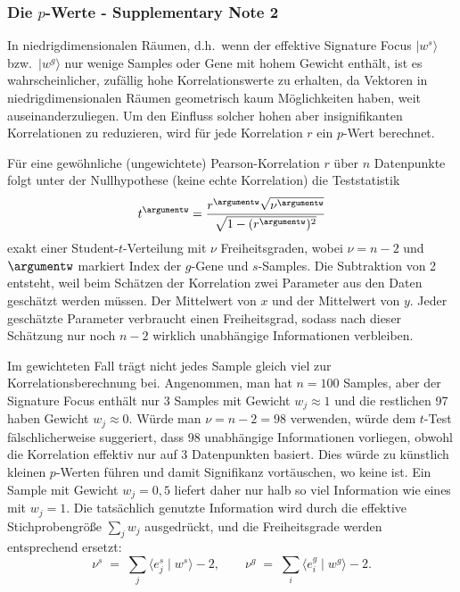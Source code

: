 \subsubsection*{Die $p$-Werte - Supplementary Note 2}


In niedrigdimensionalen Räumen, d.h.\ wenn der effektive Signature
Focus $|w^s\rangle$ bzw.\ $|w^g\rangle$ nur wenige Samples oder Gene
mit hohem Gewicht enthält, ist es wahrscheinlicher, zufällig hohe
Korrelationswerte zu erhalten, da Vektoren in niedrigdimensionalen
Räumen geometrisch kaum Möglichkeiten haben, weit auseinanderzuliegen.
Um den Einfluss solcher hohen aber insignifikanten Korrelationen zu
reduzieren, wird für jede Korrelation $r$ ein $p$-Wert berechnet.

Für eine gewöhnliche (ungewichtete) Pearson-Korrelation $r$ über $n$
Datenpunkte folgt unter der Nullhypothese (keine echte Korrelation)
die Teststatistik
\begin{equation}
t^{\argumentw}
=\frac{r^{\argumentw}\sqrt{\nu^{\argumentw}}}
{\sqrt{1-(r^{\argumentw})^2}}
\end{equation}
exakt einer Student-$t$-Verteilung mit $\nu$ Freiheitsgraden, wobei
$\nu = n - 2$ und $\argumentw$ markiert Index der $g$-Gene und $s$-Samples. Die Subtraktion von 2 entsteht, weil beim Schätzen der
Korrelation zwei Parameter aus den Daten geschätzt werden müssen. Der
Mittelwert von $x$ und der Mittelwert von $y$. Jeder geschätzte
Parameter verbraucht einen Freiheitsgrad, sodass nach dieser Schätzung
nur noch $n - 2$ wirklich unabhängige Informationen verbleiben.

Im gewichteten Fall trägt nicht jedes Sample gleich viel zur
Korrelationsberechnung bei. Angenommen, man hat $n = 100$ Samples,
aber der Signature Focus enthält nur 3 Samples mit Gewicht
$w_j \approx 1$ und die restlichen 97 haben Gewicht $w_j \approx 0$.
Würde man $\nu = n - 2 = 98$ verwenden, würde dem $t$-Test
fälschlicherweise suggeriert, dass 98 unabhängige Informationen
vorliegen, obwohl die Korrelation effektiv nur auf 3 Datenpunkten
basiert. Dies würde zu künstlich kleinen $p$-Werten führen und damit
Signifikanz vortäuschen, wo keine ist. Ein Sample mit Gewicht
$w_j = 0{,}5$ liefert daher nur halb so viel Information wie eines
mit $w_j = 1$. Die tatsächlich genutzte Information wird durch die
effektive Stichprobengröße $\sum_j w_j$ ausgedrückt, und die
Freiheitsgrade werden entsprechend ersetzt:
\begin{equation}
    \nu^s \;=\; \sum_j \langle e^s_j \mid w^s \rangle - 2,
    \qquad
    \nu^g \;=\; \sum_i \langle e^g_i \mid w^g \rangle - 2.
\end{equation}

